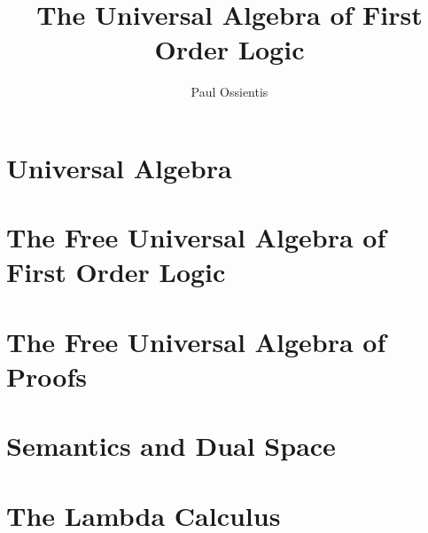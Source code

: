 \documentclass{report}
\title{The Universal Algebra of
  First Order Logic}
\author{Paul Ossientis}
\begin{document}
\maketitle
\tableofcontents
\newpage
\chapter{Universal Algebra}
    
\chapter{The Free Universal Algebra of First Order Logic}
    
\chapter{The Free Universal Algebra of Proofs}
    
\chapter{Semantics and Dual Space}
    
\chapter{The Lambda Calculus}
    
%    
%    
\printindex

\end{document}
